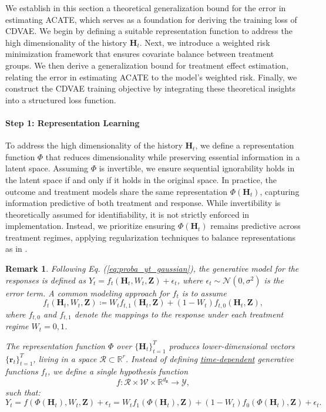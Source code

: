 \documentclass[10pt]{article} %
\newtheorem{remark}[theorem]{Remark}
\begin{document}
We establish in this section a theoretical generalization bound for the error in estimating ACATE, which serves as a foundation for deriving the training loss of CDVAE. We begin by defining a suitable representation function to address the high dimensionality of the history \(\mathbf{H}_t\). Next, we introduce a weighted risk minimization framework that ensures covariate balance between treatment groups. We then derive a generalization bound for treatment effect estimation, relating the error in estimating ACATE to the model’s weighted risk. Finally, we construct the CDVAE training objective by integrating these theoretical insights into a structured loss function.

\paragraph{Step 1: Representation Learning} To address the high dimensionality of the history \(\mathbf{H}_t\), we define a representation function \(\Phi\) that reduces dimensionality while preserving essential information in a latent space. Assuming \(\Phi\) is invertible, we ensure sequential ignorability holds in the latent space if and only if it holds in the original space. In practice, the outcome and treatment models share the same representation \(\Phi(\mathbf{H}_t)\), capturing information predictive of both treatment and response. While invertibility is theoretically assumed for identifiability, it is not strictly enforced in implementation. Instead, we prioritize ensuring \(\Phi(\mathbf{H}_t)\) remains predictive across treatment regimes, applying regularization techniques to balance representations as in \cite{shalit2017estimating, lim2018RMSM, bica2020estimatingCRN, assaad2021counterfactual, Melnychuk2022CausalTF, johansson2022generalization}.

\begin{remark}
\label{remark:from_ft_to_f}
Following Eq. (\ref{eq:proba_yt_gaussian}), the generative model for the responses is defined as \(Y_t = f_t(\mathbf{H}_t, W_t, \mathbf{Z}) + \epsilon_t \), where \( \epsilon_t \sim \mathcal{N}(0, \sigma^2) \) is the error term. A common modeling \citep{johansson2016learning, shalit2017estimating, shi2019Dragonnet, johansson2022generalization} approach for \( f_t \) is to assume  
\[
f_t(\mathbf{H}_t, W_t, \mathbf{Z}) \coloneqq W_t f_{t,1}(\mathbf{H}_t, \mathbf{Z}) + (1 - W_t) f_{t,0}(\mathbf{H}_t, \mathbf{Z}),
\]  
where \( f_{t,0} \) and \( f_{t,1} \) denote the mappings to the response under each treatment regime \( W_t = 0,1 \).  

The representation function \( \Phi \) over \( \{\mathbf{H}_t\}_{t=1}^{T} \) produces lower-dimensional vectors \( \{\mathbf{r}_t\}_{t=1}^{T} \), living in a space \( \mathcal{R} \subset \mathbb{R}^r \). Instead of defining \underline{time-dependent} generative functions \( f_t \), we define a single hypothesis function  
\[
f: \mathcal{R} \times \mathcal{W} \times \mathbb{R}^{d_{\mathbf{z}}} \rightarrow \mathcal{Y},
\]  
such that:  
\[
 Y_t = f(\Phi(\mathbf{H}_t), W_t, \mathbf{Z}) + \epsilon_t = W_t f_{1}(\Phi(\mathbf{H}_t), \mathbf{Z}) + (1-W_t) f_{0}(\Phi(\mathbf{H}_t), \mathbf{Z}) + \epsilon_t.
\]
\end{remark}
\end{document}
